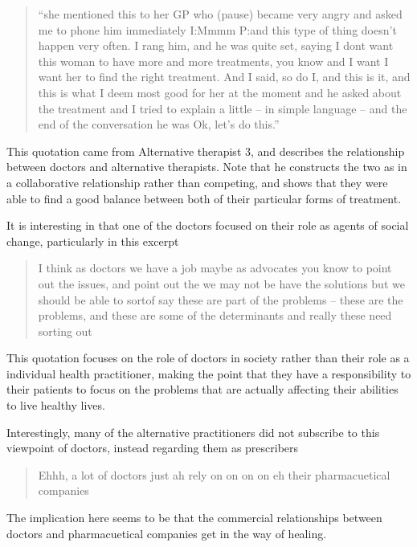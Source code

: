 \begin{quotation}
  ``she mentioned this to her GP who (pause) became very angry and asked me to phone him immediately 
I:Mmmm
P:and this type of thing doesn't happen very often. I rang him, and he was quite set, saying I dont want this woman to have more and more treatments, you know and I want I want her to find the right treatment. And I said, so do I, and this is it, and this is what I deem most good for her at the moment and he asked about the treatment and I tried to explain a little – in simple language – and the end of the conversation he was Ok, let's do this.'' 

\end{quotation}

This quotation came from Alternative therapist 3, and describes the relationship between doctors and alternative therapists. Note that he constructs the two as in a collaborative relationship rather than competing, and shows that they were able to find a good balance between both of their particular forms of treatment. 

It is interesting in that one of the doctors focused on their role as agents of social change, particularly in this excerpt

\begin{quotation}
   I think as doctors we have a job maybe as advocates you know to point out the issues, and point out the we may not be have the solutions but we should be able to sortof say these are part of the problems – these are the problems, and these are some of the determinants and really these need sorting out 

\end{quotation}

This quotation focuses on the role of doctors in society rather than their role as a individual health practitioner, making the point that they have a responsibility to their patients to focus on the problems that are actually affecting their abilities to live healthy lives. 

Interestingly, many of the alternative practitioners did not subscribe to this viewpoint of doctors, instead regarding them as prescribers 
\begin{quotation}
  Ehhh, a lot of doctors just ah rely on on on on eh their pharmacuetical companies 

\end{quotation}


The implication here seems to be that the commercial relationships between doctors and pharmacuetical companies get in the way of healing. 

